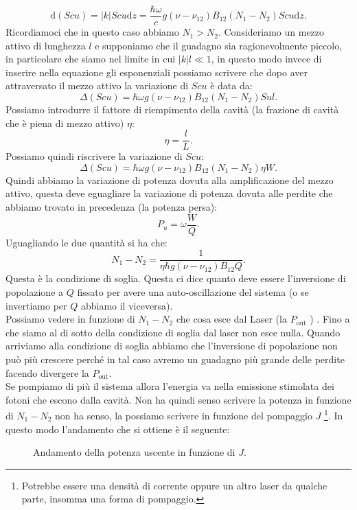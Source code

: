 \[
    \text{d}\left(Scu\right)=\left|k\right|Scu\text{d}z=
    \frac{\hbar \omega}{c}g(\nu-\nu_{12})B_{12}\left(N_1-N_2\right)Scu\text{d}z
.\] 
Ricordiamoci che in questo caso abbiamo $N_1>N_2$. Consideriamo un mezzo attivo di lunghezza $l$ e supponiamo che il guadagno sia ragionevolmente piccolo, in particolare che siamo nel limite in cui $\left|k\right|l\ll 1$, in questo modo invece di inserire nella equazione gli esponenziali possiamo scrivere che dopo aver attraversato il mezzo attivo la variazione di $Scu$ è data da:
\[
    \Delta\left(Scu\right)= \hbar \omega g(\nu-\nu_{12}) B_{12}
    \left(N_1-N_2\right)Sul
.\] 
Possiamo introdurre il fattore di riempimento della cavità (la frazione di cavità che è piena di mezzo attivo) $\eta$:
\[
\eta = \frac{l}{L} 
.\] 
Possiamo quindi riscrivere la variazione di $Scu$:
\[
    \Delta (Scu) = \hbar \omega g(\nu-\nu_{12}) B_{12}\left(N_1-N_2\right)
    \eta W
.\] 
Quindi abbiamo la variazione di potenza dovuta alla amplificazione del mezzo attivo, questa deve eguagliare la variazione di potenza dovuta alle perdite che abbiamo trovato in precedenza (la potenza persa):
\[
P_u = \omega\frac{W}{Q}
.\] 
Uguagliando le due quantità si ha che:
\[
    N_1-N_2 = \frac{1}{\eta\hbar  g(\nu-\nu_{12})B_{12}Q}
.\] 
Questa è la condizione di soglia. Questa ci dice quanto deve essere l'inversione di popolazione a $Q$ fissato per avere una auto-oscillazione del sistema (o se invertiamo per $Q$ abbiamo il viceversa).\\
Possiamo vedere in funzione di $N_1-N_2$ che cosa esce dal Laser (la $P_\text{out}$ ) .
Fino a che siamo al di sotto della condizione di soglia dal laser non esce nulla. Quando arriviamo alla condizione di soglia abbiamo che l'inversione di popolazione non può più crescere perché in tal caso avremo un guadagno più grande delle perdite facendo divergere la $P_\text{out}$.\\
Se pompiamo di più il sistema allora l'energia va nella emissione stimolata dei fotoni che escono dalla cavità. Non ha quindi senso scrivere la potenza in funzione di $N_1-N_2$  non ha senso, la possiamo scrivere in funzione del pompaggio $J$ 
\footnote{Potrebbe essere una densità di corrente oppure un altro laser da qualche parte, insomma una forma di pompaggio.}. In questo modo l'andamento che si ottiene è il seguente:
\begin{figure}[H]
    \centering
    \caption{Andamento della potenza uscente in funzione di $J$.}
    \label{Pompaggio}
\end{figure}
